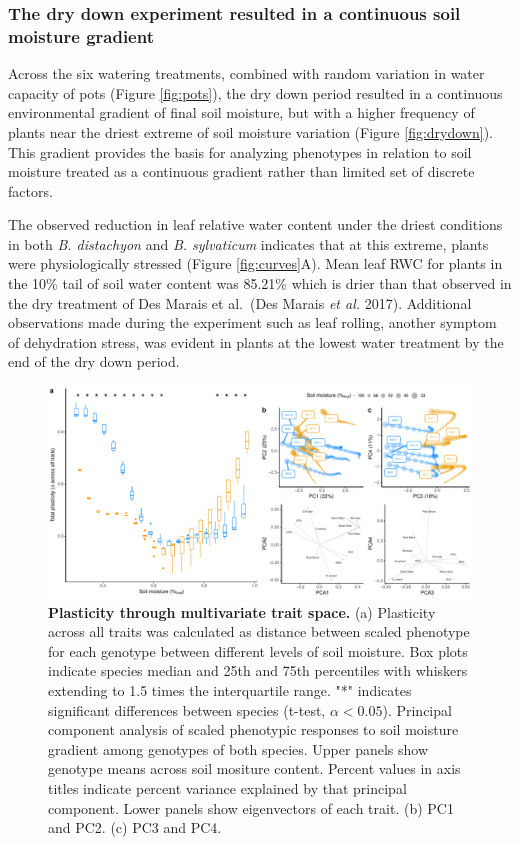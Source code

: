 \documentclass[jou,floatsintext]{apa6}
\begin{document}
\hypertarget{the-dry-down-experiment-resulted-in-a-continuous-soil-moisture-gradient}{%
\subsubsection{The dry down experiment resulted in a continuous soil moisture gradient}\label{the-dry-down-experiment-resulted-in-a-continuous-soil-moisture-gradient}}

Across the six watering treatments, combined with random variation in water capacity of pots (Figure \ref{fig:pots}), the dry down period resulted in a continuous environmental gradient of final soil moisture, but with a higher frequency of plants near the driest extreme of soil moisture variation (Figure \ref{fig:drydown}). This gradient provides the basis for analyzing phenotypes in relation to soil moisture treated as a continuous gradient rather than limited set of discrete factors.

The observed reduction in leaf relative water content under the driest conditions in both \emph{B. distachyon} and \emph{B. sylvaticum} indicates that at this extreme, plants were physiologically stressed (Figure \ref{fig:curves}A). Mean leaf RWC for plants in the 10\% tail of soil water content was 85.21\% which is drier than that observed in the dry treatment of Des Marais et al.~(Des Marais \emph{et al.} 2017). Additional observations made during the experiment such as leaf rolling, another symptom of dehydration stress, was evident in plants at the lowest water treatment by the end of the dry down period.



\begin{figure}[!h]
\includegraphics[width=\textwidth]{../Figures/pca_byspecies} \caption{\textbf{Plasticity through multivariate trait space.} (a) Plasticity across all traits was calculated as distance between scaled phenotype for each genotype between different levels of soil moisture. Box plots indicate species median and 25th and 75th percentiles with whiskers extending to 1.5 times the interquartile range. "*" indicates significant differences between species (t-test, \(\alpha < 0.05\)). Principal component analysis of scaled phenotypic responses to soil moisture gradient among genotypes of both species. Upper panels show genotype means across soil mositure content. Percent values in axis titles indicate percent variance explained by that principal component. Lower panels show eigenvectors of each trait. (b) PC1 and PC2. (c) PC3 and PC4.}\label{fig:pca}
\end{figure}
\end{document}
